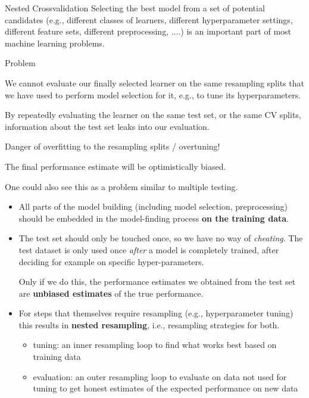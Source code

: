 \begin{frame}{Nested Crossvalidation}
Selecting the best model from a set of potential candidates (e.g., different classes of learners, different hyperparameter settings, different feature sets, different preprocessing, ....) is an important part of most  machine learning problems.

\begin{blocki}{Problem}
    \item We cannot evaluate our finally selected learner on the same resampling splits that we have used to perform model selection for it, e.g., to tune its hyperparameters.
    \item By repeatedly evaluating the learner on the same test set, or the same CV splits, information
      about the test set leaks into our evaluation.
    \item Danger of overfitting to the resampling splits / overtuning!
    \item The final performance estimate will be optimistically biased.
    \item One could also see this as a problem similar to multiple testing.
\end{blocki}

\framebreak

\begin{itemize}
\item All parts of the model building (including model selection, preprocessing) should be embedded in the model-finding process \textbf{on the training data}.
\item The test set should only be touched once, so we have no way of \textit{cheating}. The test dataset is only used once \emph{after} a model is completely trained, after deciding for example on specific hyper-parameters.

Only if we do this, the performance estimates we obtained from the test set are \textbf{unbiased estimates} of the true performance.

\item For steps that themselves require resampling (e.g., hyperparameter tuning) this results
  in \textbf{nested resampling}, i.e., resampling strategies for both.
  \begin{itemize}
  \item tuning: an inner resampling loop to find what works best based on training data
  \item evaluation: an outer resampling loop to evaluate on data not used for tuning to get honest estimates of the expected performance on new data
  \end{itemize}
\end{itemize}


\end{frame}
